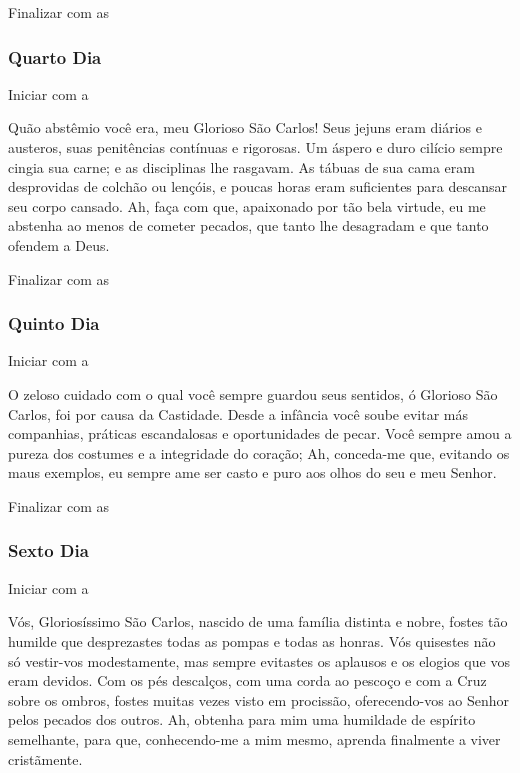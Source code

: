 \documentclass[a4paper,14pt]{extarticle} \usepackage[utf8]{inputenc}
\begin{document}
Finalizar com as \textbf{}

\subsubsection{Quarto Dia}
Iniciar com a \textbf{}

Quão abstêmio você era, meu Glorioso São Carlos! Seus jejuns eram diários e austeros, suas penitências contínuas e rigorosas. Um áspero e duro cilício sempre cingia sua carne; e as disciplinas lhe rasgavam. As tábuas de sua cama eram desprovidas de colchão ou lençóis, e poucas horas eram suficientes para descansar seu corpo cansado. Ah, faça com que, apaixonado por tão bela virtude, eu me abstenha ao menos de cometer pecados, que tanto lhe desagradam e que tanto ofendem a Deus.

Finalizar com as \textbf{}

\subsubsection{Quinto Dia}
Iniciar com a \textbf{}

O zeloso cuidado com o qual você sempre guardou seus sentidos, ó Glorioso São Carlos, foi por causa da Castidade. Desde a infância você soube evitar más companhias, práticas escandalosas e oportunidades de pecar. Você sempre amou a pureza dos costumes e a integridade do coração; Ah, conceda-me que, evitando os maus exemplos, eu sempre ame ser casto e puro aos olhos do seu e meu Senhor.

Finalizar com as \textbf{}

\subsubsection{Sexto Dia}
Iniciar com a \textbf{}

Vós, Gloriosíssimo São Carlos, nascido de uma família distinta e nobre, fostes tão humilde que desprezastes todas as pompas e todas as honras. Vós quisestes não só vestir-vos modestamente, mas sempre evitastes os aplausos e os elogios que vos eram devidos. Com os pés descalços, com uma corda ao pescoço e com a Cruz sobre os ombros, fostes muitas vezes visto em procissão, oferecendo-vos ao Senhor pelos pecados dos outros. Ah, obtenha para mim uma humildade de espírito semelhante, para que, conhecendo-me a mim mesmo, aprenda finalmente a viver cristãmente.
\end{document}
